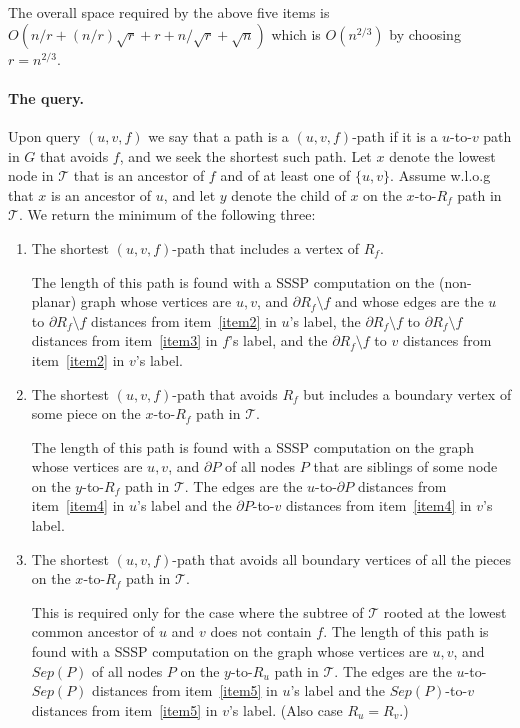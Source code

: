 \documentclass[11pt]{article}
\theoremstyle{plain}
\newcommand{\TG}{\mathcal{T}}
\begin{document}
\noindent The overall space required by the above five items is $O(n/r + (n/r)\sqrt{r} + r + n/\sqrt{r} + \sqrt{n})$ which is $O(n^{2/3})$ by choosing $r = n^{2/3}$.

\paragraph{The query.}
Upon query $(u,v,f)$ we say that a path is a $(u,v,f)$-path if it is a $u$-to-$v$ path in $G$ that avoids $f$, and we seek the shortest such path. Let $x$ denote the lowest node in $\TG$ that is an ancestor of $f$ and of at least one of $\{u,v\}$. Assume w.l.o.g that $x$ is an ancestor of $u$, and let $y$ denote the child of $x$ on the $x$-to-$R_f$ path in $\TG$. We return the minimum of the following three:    
\begin{enumerate}
\item The shortest $(u,v,f)$-path that includes a vertex of $R_f$. 

The length of this path is found with a SSSP computation on the (non-planar) graph whose vertices are $u,v$, and $\partial R_f\setminus {f}$ and whose edges are the $u$ to $\partial R_f\setminus {f}$ distances from item~\ref{item2} in $u$'s label, the $\partial R_f\setminus {f}$ to $\partial R_f\setminus {f}$ distances from item~\ref{item3} in $f$'s label, and the $\partial R_f\setminus {f}$ to $v$ distances from item~\ref{item2} in $v$'s label. 

\item The shortest $(u,v,f)$-path that avoids $R_f$ but includes a {\color{red}boundary} vertex of some piece on the {\color{red}$x$}-to-$R_f$ path in $\TG$. 

The length of this path is found with a SSSP computation on the graph whose vertices are $u,v$, and $\partial P$ of all nodes   $P$ that are siblings of some node on the $y$-to-$R_f$ path in $\TG$. The edges are the $u$-to-$\partial P$ distances from item~\ref{item4} in $u$'s label and the $\partial P$-to-$v$ distances from item~\ref{item4} in $v$'s label.

\item The shortest $(u,v,f)$-path that avoids all {\color{red}boundary vertices of all} the pieces on the {\color{red}$x$}-to-$R_f$ path in $\TG$. 

This is required only for the case where the subtree of $\TG$ rooted at the lowest common ancestor of $u$ and $v$ does not contain $f$. The length of this path is found with a SSSP computation on the graph whose vertices are $u,v$, and $Sep(P)$ of all nodes   $P$ on the $y$-to-$R_u$ path in $\TG$. The edges are the $u$-to-$Sep(P)$ distances from item~\ref{item5} in $u$'s label and the $Sep(P)$-to-$v$ distances from item~\ref{item5} in $v$'s label. {\color{red}(Also case $R_u=R_v$.)}
\end{enumerate}
\end{document}
